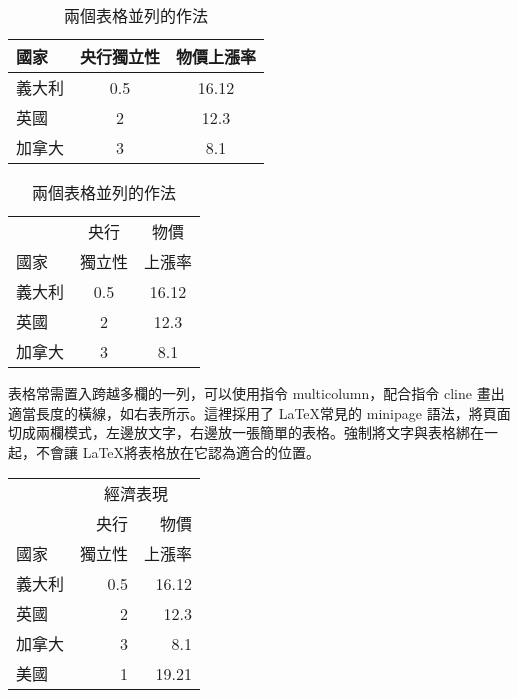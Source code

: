 \documentclass[12pt, a4paper]{article}
\begin{document}
\begin{table}[h]
    \centering
    \caption{兩個表格並列的作法}\label{tb:basic_two_table}
    \renewcommand{\arraystretch}{1.8}
    \colorbox{beaublue}{\begin{tabular}{lcc}
    \hline
    國家		& 央行獨立性	& 物價上漲率 \\\hline
    義大利   	& 0.5       	& 16.12 \\
    英國    	& 2         	& 12.3 \\
    加拿大   	& 3         	& 8.1 \\\hline
    \end{tabular}}\hspace{10pt}
    \begin{tabular}{lcc}
    \hline \rowcolor{beige}
           	& 央行	& 物價 \\[-2pt]\rowcolor{beige}
    國家    	& 獨立性 	& 上漲率 \\\hline
    義大利  	& 0.5   	& 16.12 \\
    英國    	& 2     	& 12.3 \\
    加拿大   	& 3     	& 8.1 \\\hline
    \end{tabular}
\end{table}

\begin{minipage}{.45\linewidth}
\bigskip 
表格常需置入跨越多欄的一列，可以使用指令 {\A multicolumn}，配合指令 {\A cline} 畫出適當長度的橫線，如右表所示。這裡採用了 \LaTeX 常見的 {\A minipage} 語法，將頁面切成兩欄模式，左邊放文字，右邊放一張簡單的表格。強制將文字與表格綁在一起，不會讓 \LaTeX 將表格放在它認為適合的位置。
\end{minipage}\hfill
\begin{minipage}{.55\linewidth}

    \centering
    \begin{tabular}{lrr}
    \hline
         	& \multicolumn{2}{c}{經濟表現}\\\cline{2-3}%
            	& 央行  	& 物價 \\[-2pt]
    國家    	& 獨立性 	& 上漲率 	\\\hline\rowcolor{beige}
    義大利 	& 0.5   	& 16.12 	\\\rowcolor{bisque}
    英國    	& 2     	& 12.3 	\\\rowcolor{beige}
    加拿大 	& 3     	& 8.1 	\\\rowcolor{bisque}
    美國    & 1     	& 19.21 	\\\hline
    \end{tabular}
\end{minipage}  
\end{document}
